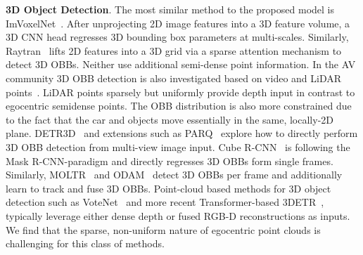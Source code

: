 \noindent\textbf{3D Object Detection}. 
The most similar method to the proposed \EFMmodel{} model is ImVoxelNet~\cite{rukhovich2022imvoxelnet}. After unprojecting 2D image features into a 3D feature volume, a 3D CNN head regresses 3D bounding box parameters at multi-scales. Similarly, Raytran~\cite{tyszkiewicz2022raytran} lifts 2D features into a 3D grid via a sparse attention mechanism to detect 3D OBBs. Neither use additional semi-dense point information.
In the AV community 3D OBB detection is also investigated based on video and LiDAR points~\cite{yin2021center,focalsconv-chen}. LiDAR points sparsely but uniformly provide depth input in contrast to egocentric semidense points. The OBB distribution is also more constrained due to the fact that the car and objects move essentially in the same, locally-2D plane.
DETR3D~\cite{wang2022detr3d} and extensions such as PARQ~\cite{Xie_2023_ICCV} explore how to directly perform 3D OBB detection from multi-view image input. 
%
Cube R-CNN~\cite{Brazil_2023_CVPR} is following the Mask R-CNN-paradigm and directly regresses 3D OBBs form single frames. Similarly, MOLTR~\cite{li2021moltr} and ODAM~\cite{li2021odam} detect 3D OBBs per frame and additionally learn to track and fuse 3D OBBs.
Point-cloud based methods for 3D object detection such as VoteNet~\cite{qi2019votenet} and more recent Transformer-based 3DETR~\cite{misra2021end}, typically leverage either dense depth or fused RGB-D reconstructions as inputs. We find that the sparse, non-uniform nature of egocentric point clouds is challenging for this class of methods.
%



